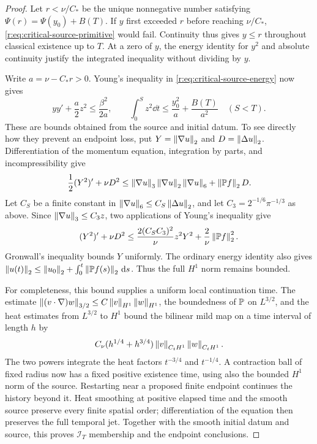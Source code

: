 \begin{proof}
Let \(r<\nu/C_*\) be the unique nonnegative number satisfying
\(\Psi(r)=\Psi(y_0)+B(T)\). If \(y\) first exceeded \(r\) before
reaching \(\nu/C_*\), \eqref{r:eq:critical-source-primitive} would fail.
Continuity thus gives \(y\le r\) throughout classical existence up
to \(T\). At a zero of \(y\), the energy identity for \(y^2\) and
absolute continuity justify the integrated inequality without dividing
by \(y\).

Write \(a=\nu-C_*r>0\). Young's inequality in
\eqref{r:eq:critical-source-energy} now gives
\[
 y y'+\frac a2 z^2\le\frac{\beta^2}{2a},\qquad
 \int_0^S z^2\dd t\le\frac{y_0^2}{a}+\frac{B(T)}{a^2}
 \quad(S<T).
\]
These are bounds obtained from the source and initial datum.
To see directly how they prevent an endpoint loss, put
\(Y=\left\lVert \nabla u\right\rVert_2\) and \(D=\left\lVert \Delta u\right\rVert_2\).
Differentiation of the momentum equation, integration by parts, and
incompressibility give
\[
 \frac12(Y^2)'+\nu D^2
 \le\left\lVert \nabla u\right\rVert_3\left\lVert \nabla u\right\rVert_2
       \left\lVert \nabla u\right\rVert_6+\left\lVert \mathbb P f\right\rVert_2D.
\]
Let \(C_S\) be a finite constant in
\(\left\lVert \nabla u\right\rVert_6\le C_S\left\lVert \Delta u\right\rVert_2\), and let
\(C_3=2^{-1/6}\pi^{-1/3}\) as above. Since
\(\left\lVert \nabla u\right\rVert_3\le C_3z\), two applications of Young's inequality
give
\[
 (Y^2)'+\nu D^2
 \le\frac{2(C_SC_3)^2}{\nu}z^2Y^2
       +\frac2\nu\left\lVert \mathbb P f\right\rVert_2^2.
\]
Gronwall's inequality bounds \(Y\) uniformly. The ordinary energy
identity also gives
\(\left\lVert u(t)\right\rVert_2\le\left\lVert u_0\right\rVert_2+
\int_0^t\left\lVert \mathbb P f(s)\right\rVert_2\,\mathrm d s\).
Thus the full \(H^1\) norm remains bounded.

For completeness, this bound supplies a uniform local continuation time.
The estimate
\(\left\lVert (v\cdot\nabla)w\right\rVert_{3/2}
\le C\left\lVert v\right\rVert_{H^1}\left\lVert w\right\rVert_{H^1}\), the boundedness of \(\mathbb P\)
on \(L^{3/2}\), and the heat estimates from \(L^{3/2}\) to \(H^1\)
bound the bilinear mild map on a time interval of length \(h\) by
\[
 C_\nu(h^{1/4}+h^{3/4})
 \left\lVert v\right\rVert_{C_tH^1}\left\lVert w\right\rVert_{C_tH^1}.
\]
The two powers integrate the heat factors \(t^{-3/4}\) and
\(t^{-1/4}\). A contraction ball of fixed radius now has a fixed
positive existence time, using also the bounded \(H^1\) norm of the
source. Restarting near a proposed finite endpoint continues the
history beyond it. Heat smoothing at positive elapsed time and the
smooth source preserve every finite spatial order; differentiation
of the equation then preserves the full temporal jet. Together with
the smooth initial datum and source, this proves \(\mathscr I_T\)
membership and the endpoint conclusions.
\end{proof}

